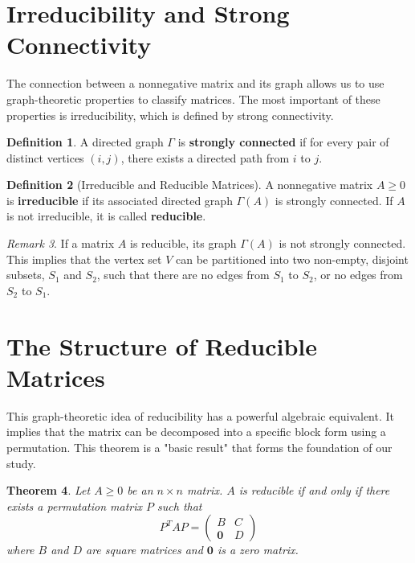 \documentclass[12pt,a4paper]{report}
\theoremstyle{plain}
\newtheorem{theorem}{Theorem}[section]
\theoremstyle{definition}
\newtheorem{definition}[theorem]{Definition}
\theoremstyle{remark}
\newtheorem{remark}[theorem]{Remark}
\begin{document}
\section{Irreducibility and Strong Connectivity}

The connection between a nonnegative matrix and its graph allows us to use graph-theoretic properties to classify matrices. The most important of these properties is irreducibility, which is defined by strong connectivity.

\begin{definition}\label{def:strong_connectivity}
A directed graph $\Gamma$ is \textbf{strongly connected} if for every pair of distinct vertices $(i, j)$, there exists a directed path from $i$ to $j$.
\end{definition}

\begin{definition}[Irreducible and Reducible Matrices]\label{def:irreducible}
A nonnegative matrix $A \ge 0$ is \textbf{irreducible} if its associated directed graph $\Gamma(A)$ is strongly connected. If $A$ is not irreducible, it is called \textbf{reducible}.
\end{definition}

\begin{remark}
If a matrix $A$ is reducible, its graph $\Gamma(A)$ is not strongly connected. This implies that the vertex set $V$ can be partitioned into two non-empty, disjoint subsets, $S_1$ and $S_2$, such that there are no edges from $S_1$ to $S_2$, or no edges from $S_2$ to $S_1$.
\end{remark}

\section{The Structure of Reducible Matrices}

This graph-theoretic idea of reducibility has a powerful algebraic equivalent. It implies that the matrix can be decomposed into a specific block form using a permutation. This theorem is a "basic result" that forms the foundation of our study.

\begin{theorem}\label{thm:reducible_structure}
Let $A \ge 0$ be an $n \times n$ matrix. $A$ is reducible if and only if there exists a permutation matrix $P$ such that
$$P^T A P = \begin{pmatrix} B & C \\ \mathbf{0} & D \end{pmatrix}$$
where $B$ and $D$ are square matrices and $\mathbf{0}$ is a zero matrix.
\end{theorem}
\end{document}
